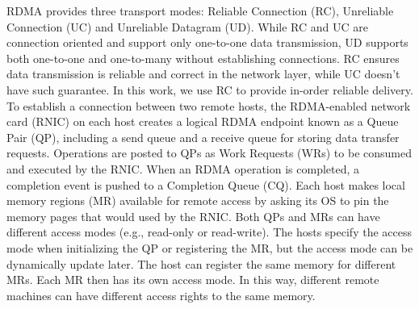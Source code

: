 RDMA provides three transport modes: Reliable Connection (RC), Unreliable Connection (UC) and Unreliable Datagram (UD). 
While RC and UC are connection oriented and support only one-to-one data transmission, UD supports both one-to-one and one-to-many without establishing connections.
RC ensures data transmission is reliable and correct in the network layer, while UC doesn’t have such guarantee.
In this work, we use RC to provide in-order reliable delivery.
To establish a connection between two remote hosts, the RDMA-enabled network card (RNIC) on each host creates a logical RDMA endpoint known as a Queue Pair (QP), including a send queue and a receive queue for storing data transfer requests. 
Operations are posted to QPs as Work Requests (WRs) to be consumed and executed by the RNIC. 
When an RDMA operation is completed, a completion event is pushed to a Completion Queue (CQ).
Each host makes local memory regions (MR) available for remote access by asking its OS to pin the memory pages that would used by the RNIC.
Both QPs and MRs can have different access modes (e.g., read-only or read-write). 
The hosts specify the access mode when initializing the QP or registering the MR, but the access mode can be dynamically update later. 
The host can register the same memory for different MRs. Each MR then has its own access mode.
In this way, different remote machines can have different access rights to the same memory. 
